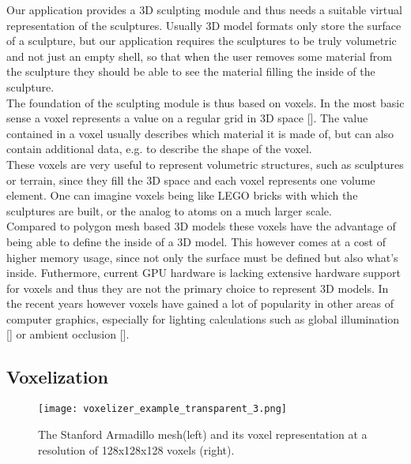 Our application provides a 3D sculpting module and thus needs a suitable virtual representation of the sculptures. Usually 3D model formats only store the surface of a sculpture, but our application requires the sculptures to be
truly volumetric and not just an empty shell, so that when the user removes some material from the sculpture they should be able to see the material filling the inside of the sculpture.\\
The foundation of the sculpting module is thus based on voxels. In the most basic sense a voxel represents a value on a regular grid in 3D space [].
The value contained in a voxel usually describes which material it is made of, but can also contain additional data, e.g. to describe the shape of the voxel.\\
These voxels are very useful to represent volumetric structures, such as sculptures or terrain, since they fill the 3D space and each voxel represents one volume element. One can imagine voxels being like LEGO bricks with which
the sculptures are built, or the analog to atoms on a much larger scale.\\
Compared to polygon mesh based 3D models these voxels have the advantage of being able to define the inside of a 3D model. This however comes at a cost of higher memory usage, since not only the surface must be defined but also what's inside. Futhermore, current GPU hardware is lacking extensive hardware support for voxels and thus they are not the primary choice to represent 3D models. In the recent years however voxels have gained a lot of popularity in other areas of computer graphics, especially for lighting calculations such as global illumination [] or ambient occlusion [].

\subsection{Voxelization}

\hfill

\begin{figure}
\centering
\captionsetup{width=0.8\textwidth}
\texttt{[image: voxelizer\_example\_transparent\_3.png]}
\caption{The Stanford Armadillo mesh\protect\footnotemark  (left) and its voxel representation at a resolution of 128x128x128 voxels (right).}
\label{fig:voxelizer_example}
\end{figure}


